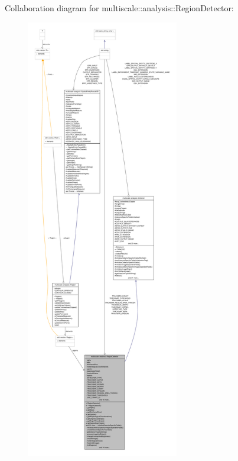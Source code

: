 \-Collaboration diagram for multiscale\-:\-:analysis\-:\-:\-Region\-Detector\-:
\nopagebreak
\begin{figure}[H]
\begin{center}
\leavevmode
\includegraphics[height=550pt]{classmultiscale_1_1analysis_1_1RegionDetector__coll__graph}
\end{center}
\end{figure}
